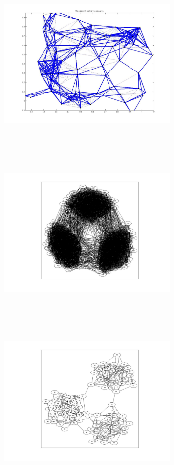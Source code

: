 \includegraphics[width=9.0cm,height=9.0cm]{images/GraphTheory/RandomGraphOptimalEdgeWithedgeWeight_PositiveTransitionProbs_FastMixingMarkovChain.jpg}
\includegraphics[width=9.0cm,height=9.0cm]{images/GraphTheory/RandomGraph_With3Cuts_.jpg}
\includegraphics[width=9.0cm,height=9.0cm]{images/GraphTheory/RandomGraph_With3Cuts_90_nodes_pii_25_pij_06.jpg}
